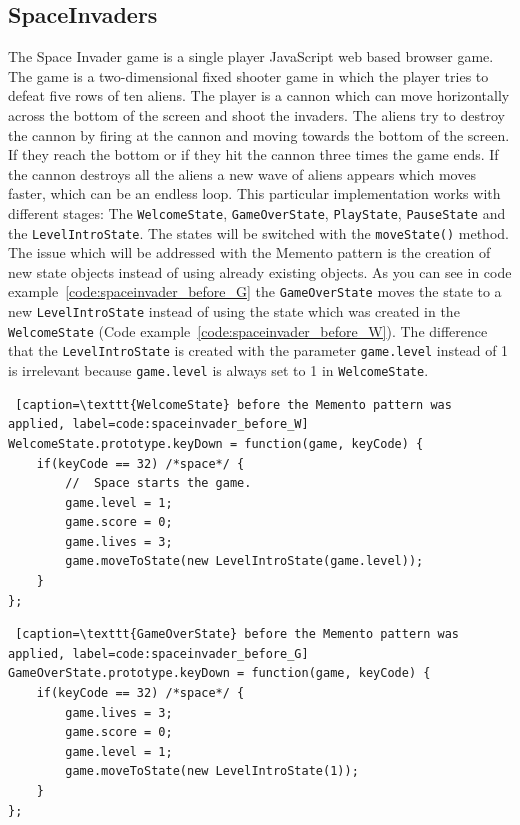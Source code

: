 \documentclass{bioinfo}
\begin{document}
\subsection{SpaceInvaders}
The Space Invader game is a single player JavaScript web based browser game. \cite{spaceinv} The game is a two-dimensional fixed shooter game in which the player tries to defeat five rows of ten aliens. The player is a cannon which can move horizontally across the bottom of the screen and shoot the invaders. The aliens try to destroy the cannon by firing at the cannon and moving towards the bottom of the screen. If they reach the bottom or if they hit the cannon three times the game ends. If the cannon destroys all the aliens a new wave of aliens appears which moves faster, which can be an endless loop. \cite{wiki:spaceinvader}       
This particular implementation works with different stages: The \texttt{WelcomeState}, \texttt{GameOverState}, \texttt{PlayState}, \texttt{PauseState} and the \texttt{LevelIntroState}. The states will be switched with the \texttt{moveState()} method.
The issue which will be addressed with the Memento pattern is the creation of new state objects instead of using already existing objects. As you can see in code example~\ref{code:spaceinvader_before_G} the \texttt{GameOverState} moves the state to a new \texttt{LevelIntroState} instead of using the state which was created in the \texttt{WelcomeState} (Code example~\ref{code:spaceinvader_before_W}). The difference that the \texttt{LevelIntroState} is created with the parameter \texttt{game.level} instead of 1 is irrelevant because \texttt{game.level} is always set to 1 in \texttt{WelcomeState}.

\begin{lstlisting} [caption=\texttt{WelcomeState} before the Memento pattern was applied, label=code:spaceinvader_before_W]
WelcomeState.prototype.keyDown = function(game, keyCode) {
    if(keyCode == 32) /*space*/ {
        //  Space starts the game.
        game.level = 1;
        game.score = 0;
        game.lives = 3;
        game.moveToState(new LevelIntroState(game.level));
    }
};
\end{lstlisting}

\begin{lstlisting} [caption=\texttt{GameOverState} before the Memento pattern was applied, label=code:spaceinvader_before_G]
GameOverState.prototype.keyDown = function(game, keyCode) {
    if(keyCode == 32) /*space*/ {
        game.lives = 3;
        game.score = 0;
        game.level = 1;
        game.moveToState(new LevelIntroState(1));
    }
};
\end{lstlisting}
\end{document}
